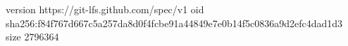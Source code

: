 version https://git-lfs.github.com/spec/v1
oid sha256:f84f767d667c5a257da8d0f4fcbe91a44849e7e0b14f5c0836a9d2efc4dad1d3
size 2796364
